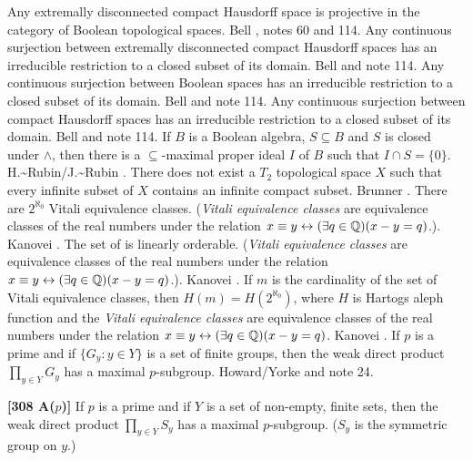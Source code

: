 \medskip
{} Any extremally disconnected compact Hausdorff
space is projective in the category of Boolean topological spaces.
\ac{Bell} \cite{1988}, notes 60 and 114.
\medskip
{} Any continuous surjection between extremally
disconnected compact Hausdorff spaces has an irreducible restriction to
a closed subset of its domain.  \ac{Bell} \cite{1988} and note 114.
\medskip
{} Any continuous surjection between Boolean spaces
has an irreducible restriction to a closed subset of its domain.
\ac{Bell} \cite{1988} and note 114.
\medskip
{} Any continuous surjection between compact
Hausdorff spaces has an irreducible restriction to a closed subset of
its domain.  \ac{Bell} \cite{1988} and note 114.
\medskip
{} If $B$ is a Boolean algebra, $S\subseteq B$ and
$S$ is closed under $\land$, then there is a $\subseteq$-maximal proper
ideal $I$ of $B$ such that $I\cap S= \{0\}$.  \ac{H.~Rubin/J.~Rubin}
\cite{1985}.
\medskip
{} There does not exist a $T_2$ topological space
$X$ such that every infinite subset of $X$ contains an infinite compact
subset. \ac{Brunner} \cite{1985c}.
\medskip
{} There are $2^{\aleph_0}$ Vitali equivalence
classes. ({\it Vitali equivalence classes} are equivalence classes of
the real numbers under the relation $x\equiv y\leftrightarrow(\exists
q\in{\Bbb Q})(x-y=q)$.). \ac{Kanovei} \cite{1991}.
\medskip
{} The set of  is
linearly orderable. ({\it Vitali equivalence classes} are equivalence
classes of the real numbers under the relation $x\equiv y\leftrightarrow
(\exists q\in{\Bbb Q})(x-y = q)$.). \ac{Kanovei} \cite{1991}.
\medskip
{} If $m$ is the cardinality of the set of
Vitali equivalence classes, then $H(m) = H(2^{\aleph_0})$, where $H$
is Hartogs aleph function and the {\it Vitali equivalence classes} are
equivalence classes of the real numbers under the relation
$x\equiv y\leftrightarrow(\exists q\in {\Bbb Q})(x-y=q)$. \ac{Kanovei}
\cite{1991}.
\medskip
{} If $p$ is a prime and if $\{G_y: y\in Y\}$
is a set of finite groups, then the weak direct product $\prod_{y\in Y}G_y$
has a maximal $p$-subgroup.  \ac{Howard/Yorke} \cite{1987}
and note 24.
\smallskip
\item{}{\bf [308 A($p$)]} If $p$ is a prime and if $Y$ is a set of
non-empty, finite sets, then the weak direct product $\prod_{y\in Y} S_y$
has a maximal $p$-subgroup. ($S_y$ is the symmetric group on $y$.)
